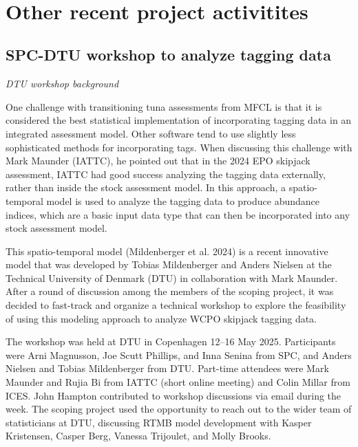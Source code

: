\documentclass{SCreport}
\begin{document}
\vspace{2ex}

~

\vspace{2ex}

\section{Other recent project activitites}

\subsection{SPC-DTU workshop to analyze tagging data}
\label{sec:dtu-2025-workshop}

\textit{DTU workshop background}

One challenge with transitioning tuna assessments from MFCL is that it is
considered the best statistical implementation of incorporating tagging data in
an integrated assessment model. Other software tend to use slightly less
sophisticated methods for incorporating tags. When discussing this challenge
with Mark Maunder (IATTC), he pointed out that in the 2024 EPO skipjack
assessment, IATTC had good success analyzing the tagging data externally, rather
than inside the stock assessment model. In this approach, a spatio-temporal
model is used to analyze the tagging data to produce abundance indices, which
are a basic input data type that can then be incorporated into any stock
assessment model.

This spatio-temporal model (Mildenberger et al. 2024) is a recent innovative
model that was developed by Tobias Mildenberger and Anders Nielsen at the
Technical University of Denmark (DTU) in collaboration with Mark Maunder. After
a round of discussion among the members of the scoping project, it was decided
to fast-track and organize a technical workshop to explore the feasibility of
using this modeling approach to analyze WCPO skipjack tagging data.

The workshop was held at DTU in Copenhagen 12--16 May 2025. Participants were
Arni Magnusson, Joe Scutt Phillips, and Inna Senina from SPC, and Anders Nielsen
and Tobias Mildenberger from DTU. Part-time attendees were Mark Maunder and
Rujia Bi from IATTC (short online meeting) and Colin Millar from ICES. John
Hampton contributed to workshop discussions via email during the week. The
scoping project used the opportunity to reach out to the wider team of
statisticians at DTU, discussing RTMB model development with Kasper Kristensen,
Casper Berg, Vanessa Trijoulet, and Molly Brooks.
\end{document}
